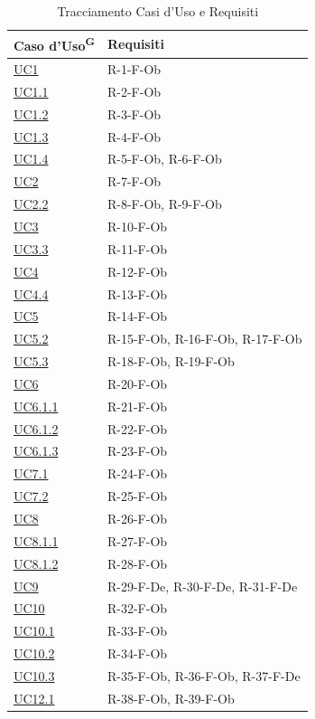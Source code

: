 \documentclass[a4paper, 11pt]{article}
\renewcommand{\arraystretch}{1.4} %
\begin{document}
\newcommand{\ucref}[1]{\hyperref[UC#1]{UC#1}}
\renewcommand{\arraystretch}{1.5}
\begin{longtable}[c]{ >{\centering\arraybackslash}m{2.5cm} >{\centering\arraybackslash}m{10cm} }
    \caption{Tracciamento Casi d'Uso e Requisiti} \\
    \rowcolor{AccentDark}
    \color{white}\textbf{Caso d'Uso\textsuperscript{G}} & \color{white}\textbf{Requisiti} \\
    \endhead

	\ucref{1} & R-1-F-Ob\\
	\ucref{1.1} & R-2-F-Ob\\
    \ucref{1.2} & R-3-F-Ob\\
    \ucref{1.3} & R-4-F-Ob\\
    \ucref{1.4} & R-5-F-Ob, R-6-F-Ob\\
    \ucref{2} & R-7-F-Ob\\
    \ucref{2.2} & R-8-F-Ob, R-9-F-Ob\\
    \ucref{3} & R-10-F-Ob\\
    \ucref{3.3} & R-11-F-Ob\\
    \ucref{4} & R-12-F-Ob\\
    \ucref{4.4} & R-13-F-Ob\\
    \ucref{5} & R-14-F-Ob\\
    \ucref{5.2} & R-15-F-Ob, R-16-F-Ob, R-17-F-Ob\\
    \ucref{5.3} & R-18-F-Ob, R-19-F-Ob\\
    \ucref{6} & R-20-F-Ob\\
    \ucref{6.1.1} & R-21-F-Ob\\
    \ucref{6.1.2} & R-22-F-Ob\\
    \ucref{6.1.3} & R-23-F-Ob\\
    \ucref{7.1} & R-24-F-Ob\\
    \ucref{7.2} & R-25-F-Ob\\
    \ucref{8} & R-26-F-Ob\\
    \ucref{8.1.1} & R-27-F-Ob\\
    \ucref{8.1.2} & R-28-F-Ob\\
    \ucref{9} & R-29-F-De, R-30-F-De, R-31-F-De\\
    \ucref{10} & R-32-F-Ob\\
    \ucref{10.1} & R-33-F-Ob\\
    \ucref{10.2} & R-34-F-Ob\\
    \ucref{10.3} & R-35-F-Ob, R-36-F-Ob, R-37-F-De\\
    \ucref{12.1} & R-38-F-Ob, R-39-F-Ob\\

\end{longtable}
\end{document}
